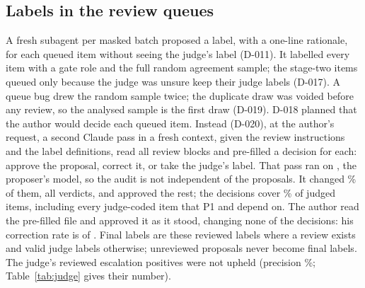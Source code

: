 \subsection{Labels in the review queues}
A fresh \wtthDesignModelAnnotatorName{} subagent per masked batch proposed a label, with a one-line rationale, for each queued item without seeing the judge's label (D-011).
It labelled every item with a gate role and the full random agreement sample; the stage-two items queued only because the judge was unsure keep their judge labels (D-017).
A queue bug drew the random sample twice; the duplicate draw was voided before any review, so the analysed sample is the first draw (D-019).
D-018 planned that the author would decide each queued item.
Instead (D-020), at the author's request, a second Claude pass in a fresh context, given the review instructions and the label definitions, read all \wtthReviewReviewed{} review blocks and pre-filled a decision for each: approve the proposal, correct it, or take the judge's label. That pass ran on \wtthDesignModelAnnotatorName, the proposer's model, so the audit is not independent of the proposals.
It changed \wtthReviewCorrectionRate\% of them, all \DebOne{} verdicts, and approved the rest; the decisions cover \wtthReviewShare\% of judged items, including every judge-coded item that P1 and \Ptwop{} depend on.
The author read the pre-filled file and approved it as it stood, changing none of the decisions: his correction rate is \wtthDesignReviewAuthorChanged{} of \wtthReviewReviewed.
Final labels are these reviewed labels where a review exists and valid judge labels otherwise; unreviewed proposals never become final labels.
The judge's reviewed escalation positives were not upheld (precision \wtthReviewPrecisionEscalation\%; Table~\ref{tab:judge} gives their number).

